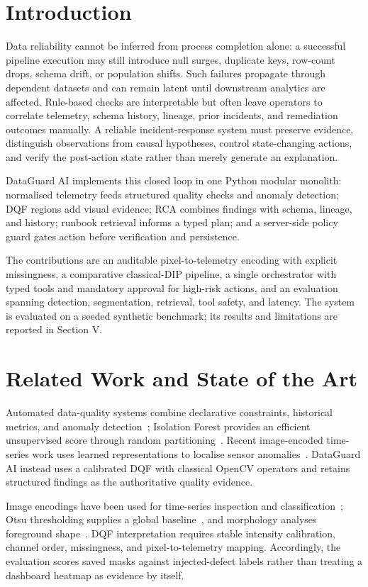 \documentclass[conference]{IEEEtran}
\begin{document}
\section{Introduction}
Data reliability cannot be inferred from process completion alone: a successful pipeline execution may still introduce null surges, duplicate keys, row-count drops, schema drift, or population shifts. Such failures propagate through dependent datasets and can remain latent until downstream analytics are affected. Rule-based checks are interpretable but often leave operators to correlate telemetry, schema history, lineage, prior incidents, and remediation outcomes manually. A reliable incident-response system must preserve evidence, distinguish observations from causal hypotheses, control state-changing actions, and verify the post-action state rather than merely generate an explanation.

DataGuard AI implements this closed loop in one Python modular monolith: normalised telemetry feeds structured quality checks and anomaly detection; DQF regions add visual evidence; RCA combines findings with schema, lineage, and history; runbook retrieval informs a typed plan; and a server-side policy guard gates action before verification and persistence.

The contributions are an auditable pixel-to-telemetry encoding with explicit missingness, a comparative classical-DIP pipeline, a single orchestrator with typed tools and mandatory approval for high-risk actions, and an evaluation spanning detection, segmentation, retrieval, tool safety, and latency. The system is evaluated on a seeded synthetic benchmark; its results and limitations are reported in Section V.

\section{Related Work and State of the Art}
Automated data-quality systems combine declarative constraints, historical metrics, and anomaly detection~\cite{deequ}; Isolation Forest provides an efficient unsupervised score through random partitioning~\cite{isolation}. Recent image-encoded time-series work uses learned representations to localise sensor anomalies~\cite{ma2024}. DataGuard AI instead uses a calibrated DQF with classical OpenCV operators and retains structured findings as the authoritative quality evidence.

Image encodings have been used for time-series inspection and classification~\cite{wang}; Otsu thresholding supplies a global baseline~\cite{otsu}, and morphology analyses foreground shape~\cite{serra}. DQF interpretation requires stable intensity calibration, channel order, missingness, and pixel-to-telemetry mapping. Accordingly, the evaluation scores saved masks against injected-defect labels rather than treating a dashboard heatmap as evidence by itself.
\end{document}

